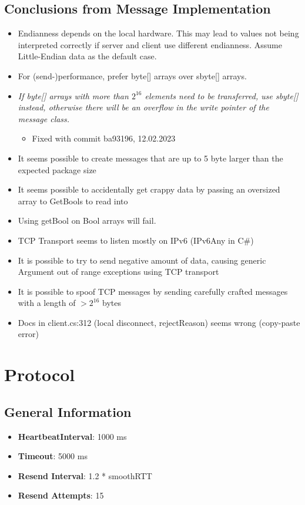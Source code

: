 \section{Conclusions from Message Implementation}

\begin{itemize}
	\item Endianness depends on the local hardware. This may lead to values not being interpreted correctly if server and client use different endianness. Assume Little-Endian data as the default case.
	\item For (send-)performance, prefer byte[] arrays over sbyte[] arrays.
	\item \textit{If byte[] arrays with more than $2^{16}$ elements need to be transferred, use sbyte[] instead, otherwise there will be an overflow in the write pointer of the message class. } 
	\begin{itemize}
		\item Fixed with commit ba93196, 12.02.2023
	\end{itemize}
	\item It seems possible to create messages that are up to 5 byte larger than the expected package size
	\item It seems possible to accidentally get crappy data by passing an oversized array to GetBools to read into
	\item Using getBool on Bool arrays will fail.
	\item TCP Transport seems to listen mostly on IPv6 (IPv6Any in C\#)
	\item It is possible to try to send negative amount of data, causing generic Argument out of range exceptions using TCP transport
	\item It is possible to spoof TCP messages by sending carefully crafted messages with a length of $> 2^{16}$ bytes
	\item Docs in client.cs:312 (local disconnect, rejectReason) seems wrong (copy-paste error)
\end{itemize}


\chapter{Protocol}

\section{General Information}

\begin{itemize}
	\item \textbf{HeartbeatInterval}: 1000 ms
	\item \textbf{Timeout}: 5000 ms
	\item \textbf{Resend Interval}: 1.2 * smoothRTT
	\item \textbf{Resend Attempts}: 15
\end{itemize}

